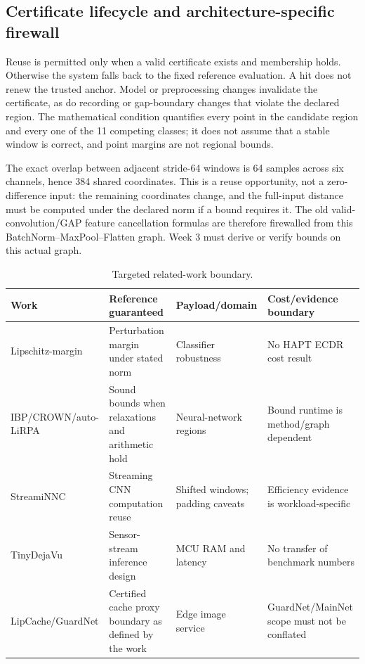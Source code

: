 \documentclass[11pt,a4paper]{article}
\begin{document}
\subsection{Certificate lifecycle and architecture-specific firewall}
Reuse is permitted only when a valid certificate exists and membership holds.
Otherwise the system falls back to the fixed reference evaluation. A hit does
not renew the trusted anchor. Model or preprocessing changes invalidate the
certificate, as do recording or gap-boundary changes that violate the declared
region. The mathematical condition quantifies every point in the candidate
region and every one of the 11 competing classes; it does not assume that a
stable window is correct, and point margins are not regional bounds.

The exact overlap between adjacent stride-64 windows is 64 samples across six
channels, hence 384 shared coordinates. This is a reuse opportunity, not a
zero-difference input: the remaining coordinates change, and the full-input
distance must be computed under the declared norm if a bound requires it.
The old valid-convolution/GAP feature cancellation formulas are therefore
firewalled from this BatchNorm--MaxPool--Flatten graph. Week 3 must derive or
verify bounds on this actual graph.

\begin{table}[ht]\centering\small
\caption{Targeted related-work boundary.}\begin{tabularx}{\linewidth}{@{}lYYY@{}}\toprule
Work & Reference guaranteed & Payload/domain & Cost/evidence boundary\\\midrule
Lipschitz-margin \cite{lmt} & Perturbation margin under stated norm & Classifier robustness & No HAPT ECDR cost result\\
IBP/CROWN/auto-LiRPA \cite{ibp,crown,lirpa} & Sound bounds when relaxations and arithmetic hold & Neural-network regions & Bound runtime is method/graph dependent\\
StreamiNNC \cite{streaminnc} & Streaming CNN computation reuse & Shifted windows; padding caveats & Efficiency evidence is workload-specific\\
TinyDejaVu \cite{tiny} & Sensor-stream inference design & MCU RAM and latency & No transfer of benchmark numbers\\
LipCache/GuardNet \cite{lipcache} & Certified cache proxy boundary as defined by the work & Edge image service & GuardNet/MainNet scope must not be conflated\\\bottomrule
\end{tabularx}\end{table}
\end{document}
